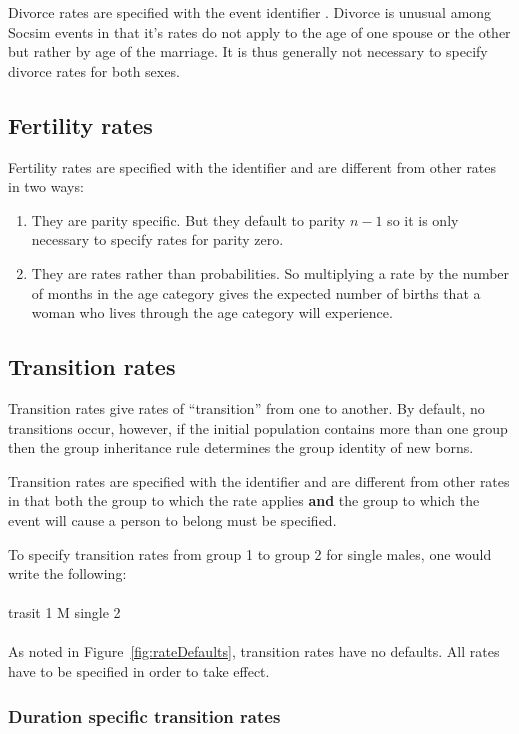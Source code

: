 Divorce rates are specified with the event identifier .
Divorce is unusual among Socsim events in that it's rates do not apply
to the age of one spouse or the other but rather by age of the
marriage.  It is thus generally not necessary to specify divorce rates
for both sexes.

\subsection{Fertility rates}

Fertility rates are specified with the identifier  and are
different from other rates in two ways:
\begin{enumerate}
\item They are parity specific. But they default to parity $n-1$ so it
  is only necessary to specify rates for parity zero.
\item They are rates rather than probabilities. So multiplying a
  rate by the number of months in the age category gives the expected
  number of births that a woman who lives through the age category
  will experience.
\end{enumerate}

\subsection{Transition rates}
\label{sec:transit}
Transition rates give rates of ``transition'' from one  to
another.  By default, no transitions occur, however, if the initial
population contains more than one group then the group inheritance
rule determines the group identity of new borns.

Transition rates are specified with the identifier  and
are different from other rates in that both the group to which the
rate applies \textbf{and} the group to which the event will cause a
person to belong must be specified.  

To specify transition rates from group 1 to group 2 for single males,
one would write the following:\\
\\
trasit 1 M single 2\\
\\
As noted in   Figure~\ref{fig:rateDefaults}, transition rates have no
defaults. All rates  have to be specified in order to take effect. 

\subsubsection{Duration specific transition rates}
\label{sec:duratspectrans}

